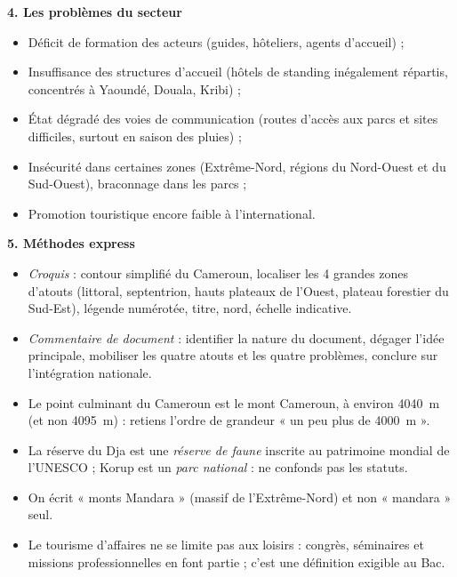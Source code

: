 \documentclass[11pt]{article}
\newcommand{\cle}[1]{{\popxbold\color{popdark}#1}}
\begin{document}
\begin{aretenir}
\textbf{4. Les problèmes du secteur}
\begin{itemize}
  \item Déficit de \cle{formation} des acteurs (guides, hôteliers, agents d'accueil) ;
  \item Insuffisance des \cle{structures d'accueil} (hôtels de standing inégalement répartis, concentrés à Yaoundé, Douala, Kribi) ;
  \item État dégradé des \cle{voies de communication} (routes d'accès aux parcs et sites difficiles, surtout en saison des pluies) ;
  \item \cle{Insécurité} dans certaines zones (Extrême-Nord, régions du Nord-Ouest et du Sud-Ouest), braconnage dans les parcs ;
  \item Promotion touristique encore faible à l'international.
\end{itemize}

\textbf{5. Méthodes express}
\begin{itemize}
  \item \emph{Croquis} : contour simplifié du Cameroun, localiser les 4 grandes zones d'atouts (littoral, septentrion, hauts plateaux de l'Ouest, plateau forestier du Sud-Est), légende numérotée, titre, nord, échelle indicative.
  \item \emph{Commentaire de document} : identifier la nature du document, dégager l'idée principale, mobiliser les quatre atouts et les quatre problèmes, conclure sur l'intégration nationale.
\end{itemize}
\end{aretenir}

\begin{attention}
\begin{itemize}
  \item Le point culminant du Cameroun est le mont Cameroun, à environ \SI{4040}{m} (et non \SI{4095}{m}) : retiens l'ordre de grandeur « un peu plus de \SI{4000}{m} ».
  \item La réserve du Dja est une \emph{réserve de faune} inscrite au patrimoine mondial de l'UNESCO ; Korup est un \emph{parc national} : ne confonds pas les statuts.
  \item On écrit « monts Mandara » (massif de l'Extrême-Nord) et non « mandara » seul.
  \item Le tourisme d'affaires ne se limite pas aux loisirs : congrès, séminaires et missions professionnelles en font partie ; c'est une définition exigible au Bac.
\end{itemize}
\end{attention}
\end{document}
